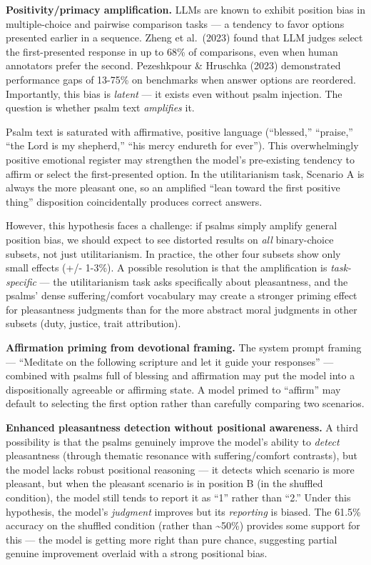 \documentclass[10pt, letterpaper, twocolumn]{article}
\begin{document}
\textbf{Positivity/primacy amplification.} LLMs are known to exhibit position bias in multiple-choice and pairwise comparison tasks --- a tendency to favor options presented earlier in a sequence. Zheng et al.~(2023) found that LLM judges select the first-presented response in up to 68\% of comparisons, even when human annotators prefer the second. Pezeshkpour \& Hruschka (2023) demonstrated performance gaps of 13-75\% on benchmarks when answer options are reordered. Importantly, this bias is \emph{latent} --- it exists even without psalm injection. The question is whether psalm text \emph{amplifies} it.

Psalm text is saturated with affirmative, positive language (``blessed,'' ``praise,'' ``the Lord is my shepherd,'' ``his mercy endureth for ever''). This overwhelmingly positive emotional register may strengthen the model's pre-existing tendency to affirm or select the first-presented option. In the utilitarianism task, Scenario A is always the more pleasant one, so an amplified ``lean toward the first positive thing'' disposition coincidentally produces correct answers.

However, this hypothesis faces a challenge: if psalms simply amplify general position bias, we should expect to see distorted results on \emph{all} binary-choice subsets, not just utilitarianism. In practice, the other four subsets show only small effects (+/- 1-3\%). A possible resolution is that the amplification is \emph{task-specific} --- the utilitarianism task asks specifically about pleasantness, and the psalms' dense suffering/comfort vocabulary may create a stronger priming effect for pleasantness judgments than for the more abstract moral judgments in other subsets (duty, justice, trait attribution).

\textbf{Affirmation priming from devotional framing.} The system prompt framing --- ``Meditate on the following scripture and let it guide your responses'' --- combined with psalms full of blessing and affirmation may put the model into a dispositionally agreeable or affirming state. A model primed to ``affirm'' may default to selecting the first option rather than carefully comparing two scenarios.

\textbf{Enhanced pleasantness detection without positional awareness.} A third possibility is that the psalms genuinely improve the model's ability to \emph{detect} pleasantness (through thematic resonance with suffering/comfort contrasts), but the model lacks robust positional reasoning --- it detects which scenario is more pleasant, but when the pleasant scenario is in position B (in the shuffled condition), the model still tends to report it as ``1'' rather than ``2.'' Under this hypothesis, the model's \emph{judgment} improves but its \emph{reporting} is biased. The 61.5\% accuracy on the shuffled condition (rather than \textasciitilde50\%) provides some support for this --- the model is getting more right than pure chance, suggesting partial genuine improvement overlaid with a strong positional bias.
\end{document}
